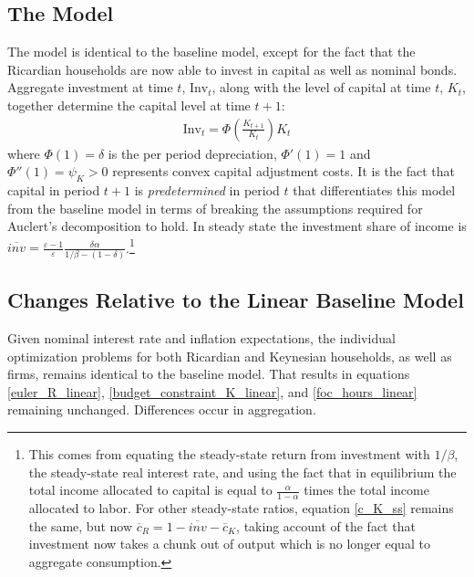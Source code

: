 \documentclass[titlepage]{\econtex}\newcommand{\texname}{ConsumptionHeterogeneity}
\begin{document}
\subsection{The Model}
The model is identical to the baseline model, except for the fact that the Ricardian households are now able to invest in capital as well as nominal bonds. Aggregate investment at time $t$, $\text{Inv}_t$, along with the level of capital at time $t$, $K_t$, together determine the capital level at time $t+1$:
\begin{align}
\text{Inv}_t = \Phi\left(\frac{K_{t+1}}{K_t}\right) K_t
\end{align}
where $\Phi(1) =\delta$ is the per period depreciation, $\Phi'(1) =1$ and $\Phi''(1) =\psi_K >0 $ represents convex capital adjustment costs. It is the fact that capital in period $t+1$ is \textit{predetermined} in period $t$ that differentiates this model from the baseline model in terms of breaking the assumptions required for Auclert's decomposition to hold. In steady state the investment share of income is $\overline{\textit{inv}} = \frac{\varepsilon-1}{\varepsilon} \frac{\delta \alpha}{1/\beta - (1-\delta)}$.\footnote{This comes from equating the steady-state return from investment with $1/\beta$, the steady-state real interest rate, and using the fact that in equilibrium the total income allocated to capital is equal to $\frac{\alpha}{1-\alpha}$ times the total income allocated to labor. For other steady-state ratios, equation \ref{c_K_ss} remains the same, but now $\overline{c}_{R}=1-\overline{\textit{inv}}-\overline{c}_{K}$, taking account of the fact that investment now takes a chunk out of output which is no longer equal to aggregate consumption.}

\subsection{Changes Relative to the Linear Baseline Model}
Given nominal interest rate and inflation expectations, the individual optimization problems for both Ricardian and Keynesian households, as well as firms, remains identical to the baseline model. That results in equations \ref{euler_R_linear}, \ref{budget_constraint_K_linear}, and \ref{foc_hours_linear} remaining unchanged. Differences occur in aggregation.
\end{document}
